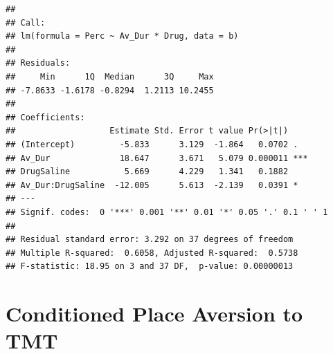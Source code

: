 \documentclass[
]{book}
\newenvironment{Shaded}{\begin{snugshade}}{\end{snugshade}}
\newcommand{\AttributeTok}[1]{\textcolor[rgb]{0.13,0.29,0.53}{#1}}
\newcommand{\CommentTok}[1]{\textcolor[rgb]{0.56,0.35,0.01}{\textit{#1}}}
\newcommand{\FunctionTok}[1]{\textcolor[rgb]{0.13,0.29,0.53}{\textbf{#1}}}
\newcommand{\NormalTok}[1]{#1}
\newcommand{\OtherTok}[1]{\textcolor[rgb]{0.56,0.35,0.01}{#1}}
\newcommand{\SpecialCharTok}[1]{\textcolor[rgb]{0.81,0.36,0.00}{\textbf{#1}}}
\newcommand{\StringTok}[1]{\textcolor[rgb]{0.31,0.60,0.02}{#1}}
\begin{document}
\begin{Shaded}
\end{Shaded}

\begin{verbatim}
## 
## Call:
## lm(formula = Perc ~ Av_Dur * Drug, data = b)
## 
## Residuals:
##     Min      1Q  Median      3Q     Max 
## -7.8633 -1.6178 -0.8294  1.2113 10.2455 
## 
## Coefficients:
##                   Estimate Std. Error t value Pr(>|t|)    
## (Intercept)         -5.833      3.129  -1.864   0.0702 .  
## Av_Dur              18.647      3.671   5.079 0.000011 ***
## DrugSaline           5.669      4.229   1.341   0.1882    
## Av_Dur:DrugSaline  -12.005      5.613  -2.139   0.0391 *  
## ---
## Signif. codes:  0 '***' 0.001 '**' 0.01 '*' 0.05 '.' 0.1 ' ' 1
## 
## Residual standard error: 3.292 on 37 degrees of freedom
## Multiple R-squared:  0.6058, Adjusted R-squared:  0.5738 
## F-statistic: 18.95 on 3 and 37 DF,  p-value: 0.00000013
\end{verbatim}

\hypertarget{conditioned-place-aversion-to-tmt}{%
\chapter{Conditioned Place Aversion to TMT}\label{conditioned-place-aversion-to-tmt}}
\end{document}
